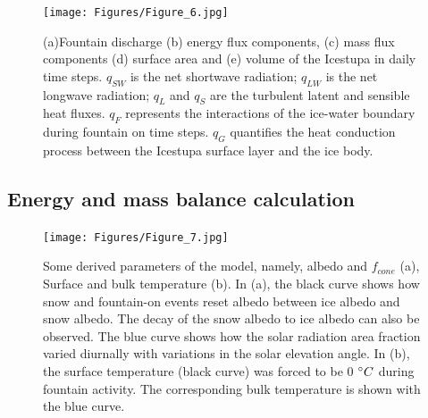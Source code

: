 \documentclass[utf8]{frontiersSCNS} %
\begin{document}
\begin{figure} \begin{center} \texttt{[image: Figures/Figure\_6.jpg]} \end{center}
\caption{(a)Fountain discharge (b) energy flux components, (c) mass flux components (d) surface area and (e) volume of
  the Icestupa in daily time steps.  $q_{SW}$ is the net shortwave radiation; $q_{LW}$ is the net longwave radiation;
  $q_{L}$ and $q_{S}$ are the turbulent latent and sensible heat fluxes. $q_{F}$ represents the interactions of the
  ice-water boundary during fountain on time steps.  $q_{G}$ quantifies the heat conduction process between the
  Icestupa surface layer and the ice body. } \label{fig:EB} \end{figure} \subsection{Energy and mass balance
calculation}

\begin{figure} \begin{center} \texttt{[image: Figures/Figure\_7.jpg]} \end{center} \caption{Some derived
  parameters of the model, namely, albedo and $f_{cone}$ (a), Surface and bulk temperature (b). In (a), the black curve
  shows how snow and fountain-on events reset albedo between ice albedo and snow albedo.  The decay of the snow albedo
  to ice albedo can also be observed. The blue curve shows how the solar radiation area fraction varied diurnally with
  variations in the solar elevation angle. In (b), the surface temperature (black curve) was forced to be 0 $\degree C$
  during fountain activity. The corresponding bulk temperature is shown with the blue curve.} \label{fig:derived}
  \end{figure}
  
\end{document}
